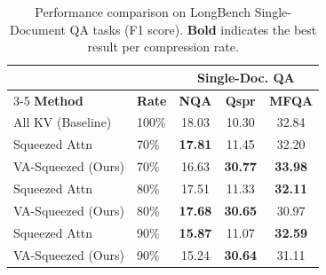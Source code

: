 \begin{table}[t]
\centering
\caption{Performance comparison on LongBench Single-Document QA tasks (F1 score). \textbf{Bold} indicates the best result per compression rate.}
\label{tab:results}
\begin{tabular}{llccc}
\toprule
 & & \multicolumn{3}{c}{\textbf{Single-Doc. QA}} \\
\cmidrule(lr){3-5}
\textbf{Method} & \textbf{Rate} & \textbf{NQA} & \textbf{Qspr} & \textbf{MFQA} \\
\midrule
All KV (Baseline) & 100\% & 18.03 & 10.30 & 32.84 \\
\midrule
Squeezed Attn & 70\% & \textbf{17.81} & 11.45 & 32.20 \\
VA-Squeezed (Ours) & 70\% & 16.63 & \textbf{30.77} & \textbf{33.98} \\
\midrule
Squeezed Attn & 80\% & 17.51 & 11.33 & \textbf{32.11} \\
VA-Squeezed (Ours) & 80\% & \textbf{17.68} & \textbf{30.65} & 30.97 \\
\midrule
Squeezed Attn & 90\% & \textbf{15.87} & 11.07 & \textbf{32.59} \\
VA-Squeezed (Ours) & 90\% & 15.24 & \textbf{30.64} & 31.11 \\
\bottomrule
\end{tabular}
\end{table}